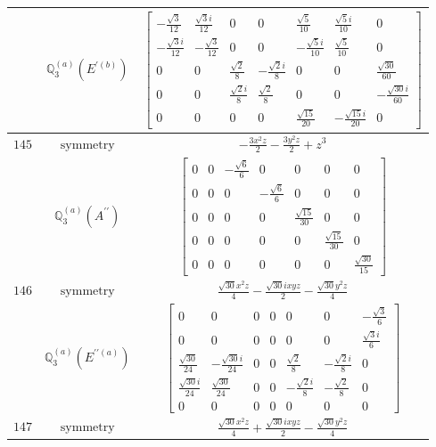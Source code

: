 \documentclass[fleqn,8pt,landscape]{jsarticle}
\begin{document}
\begin{longtable}{ccc}
$  $ & $ \mathbb{Q}_{3}^{(a)}(E^{\prime(b)}) $ & $ \begin{bmatrix} - \frac{\sqrt{3}}{12} & \frac{\sqrt{3} i}{12} & 0 & 0 & \frac{\sqrt{5}}{10} & \frac{\sqrt{5} i}{10} & 0 \\ - \frac{\sqrt{3} i}{12} & - \frac{\sqrt{3}}{12} & 0 & 0 & - \frac{\sqrt{5} i}{10} & \frac{\sqrt{5}}{10} & 0 \\ 0 & 0 & \frac{\sqrt{2}}{8} & - \frac{\sqrt{2} i}{8} & 0 & 0 & \frac{\sqrt{30}}{60} \\ 0 & 0 & \frac{\sqrt{2} i}{8} & \frac{\sqrt{2}}{8} & 0 & 0 & - \frac{\sqrt{30} i}{60} \\ 0 & 0 & 0 & 0 & \frac{\sqrt{15}}{20} & - \frac{\sqrt{15} i}{20} & 0 \end{bmatrix} $ \\ \hline
$ 145 $ & $ \text{symmetry} $ & $ - \frac{3 x^{2} z}{2} - \frac{3 y^{2} z}{2} + z^{3} $ \\
$  $ & $ \mathbb{Q}_{3}^{(a)}(A^{\prime\prime}) $ & $ \begin{bmatrix} 0 & 0 & - \frac{\sqrt{6}}{6} & 0 & 0 & 0 & 0 \\ 0 & 0 & 0 & - \frac{\sqrt{6}}{6} & 0 & 0 & 0 \\ 0 & 0 & 0 & 0 & \frac{\sqrt{15}}{30} & 0 & 0 \\ 0 & 0 & 0 & 0 & 0 & \frac{\sqrt{15}}{30} & 0 \\ 0 & 0 & 0 & 0 & 0 & 0 & \frac{\sqrt{30}}{15} \end{bmatrix} $ \\ \hline
$ 146 $ & $ \text{symmetry} $ & $ \frac{\sqrt{30} x^{2} z}{4} - \frac{\sqrt{30} i x y z}{2} - \frac{\sqrt{30} y^{2} z}{4} $ \\
$  $ & $ \mathbb{Q}_{3}^{(a)}(E^{\prime\prime(a)}) $ & $ \begin{bmatrix} 0 & 0 & 0 & 0 & 0 & 0 & - \frac{\sqrt{3}}{6} \\ 0 & 0 & 0 & 0 & 0 & 0 & \frac{\sqrt{3} i}{6} \\ \frac{\sqrt{30}}{24} & - \frac{\sqrt{30} i}{24} & 0 & 0 & \frac{\sqrt{2}}{8} & - \frac{\sqrt{2} i}{8} & 0 \\ \frac{\sqrt{30} i}{24} & \frac{\sqrt{30}}{24} & 0 & 0 & - \frac{\sqrt{2} i}{8} & - \frac{\sqrt{2}}{8} & 0 \\ 0 & 0 & 0 & 0 & 0 & 0 & 0 \end{bmatrix} $ \\ \hline
$ 147 $ & $ \text{symmetry} $ & $ \frac{\sqrt{30} x^{2} z}{4} + \frac{\sqrt{30} i x y z}{2} - \frac{\sqrt{30} y^{2} z}{4} $ \\

\end{longtable}
\end{document}
